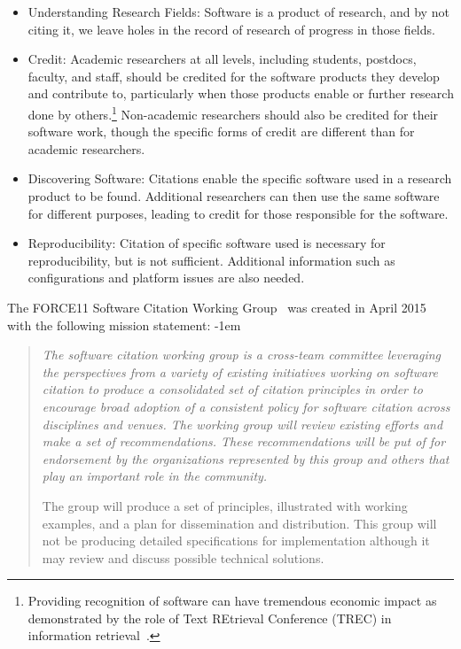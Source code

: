 \documentclass[12pt, oneside]{amsart}
\newenvironment{italicquotes}
{\begin{quote}\itshape}
{\end{quote}}
\begin{document}
\begin{itemize}
\item Understanding Research Fields: Software is a product of research, and by not
citing it, we leave holes in the record of research of progress in those fields.

\item Credit: Academic researchers at all levels, including students,
postdocs, faculty, and staff, should be credited for the software products they
develop and contribute to, particularly when those products enable or further
research done by others.\footnote{Providing recognition of software can have tremendous economic impact as demonstrated by the role of Text REtrieval Conference (TREC) in information retrieval~\cite{trec-economic-impact}.}
Non-academic researchers should also be credited for their software
work, though the specific forms of credit are different than for academic researchers.

\item Discovering Software: Citations enable the specific software used in a
research product to be found. Additional researchers can then use the same
software for different purposes, leading to credit for those responsible for the
software.

\item Reproducibility: Citation of specific software used is necessary for
reproducibility, but is not sufficient. Additional information such as
configurations and platform issues are also needed.

\end{itemize}


The FORCE11 Software Citation Working Group~\cite{f11scwg} was created in April
2015 with the following mission statement:
\advance\leftmargini -1em
\begin{italicquotes}
The software citation working group is a cross-team committee leveraging the
perspectives from a variety of existing initiatives working on software citation
to produce a consolidated set of citation principles in order to encourage broad
adoption of a consistent policy for software citation across disciplines and
venues. The working group will review existing efforts and make a set of
recommendations. These recommendations will be put of for endorsement by the
organizations represented by this group and others that play an important role
in the community.

The group will produce a set of principles, illustrated with working examples,
and a plan for dissemination and distribution. This group will not be producing
detailed specifications for implementation although it may review and discuss
possible technical solutions.
\end{italicquotes}
\end{document}
